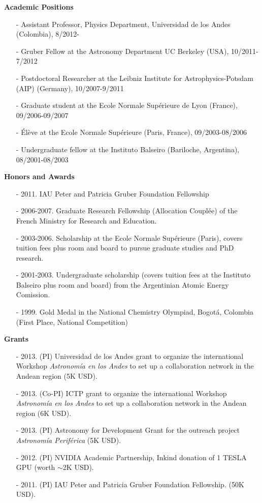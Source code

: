 \documentclass[letterpaper,11pt,onecolumn]{article}
\begin{document}
{\bf Academic Positions}
\begin{itemize}
\item[-] Assistant Professor, Physics Department, Universidad de los Andes (Colombia), 8/2012-
\item[-] Gruber Fellow at the Astronomy Department UC Berkeley (USA), 10/2011-7/2012
\item[-] Postdoctoral Researcher at the Leibniz Institute for
  Astrophysics-Potsdam (AIP) (Germany), 10/2007-9/2011  
\item[-] Graduate student at the Ecole Normale Sup\'erieure de Lyon
  (France), 09/2006-09/2007  
\item[-] \'El\`eve at the Ecole Normale Sup\'erieure (Paris, France),
  09/2003-08/2006 
\item[-] Undergraduate fellow at the Instituto Balseiro (Bariloche,
  Argentina), 08/2001-08/2003 
\end{itemize}

\newpage
{\bf Honors and Awards}
\begin{itemize}
\item[-] 2011. IAU Peter and Patricia Gruber Foundation Fellowship
\item[-] 2006-2007. Graduate Research Fellowship (Allocation Coupl\'ee) of the French
  Ministry for Research and Education.
\item[-] 2003-2006. Scholarship at the Ecole Normale Sup\'erieure (Paris), covers tuition fees plus room and
  board to pursue graduate studies and PhD research.
\item[-] 2001-2003. Undergraduate scholarship (covers tuition fees at the
  Instituto Balseiro plus room and board) from the Argentinian Atomic Energy
  Comission.
\item[-] 1999. Gold Medal in the National Chemistry Olympiad, Bogot\'a,
  Colombia (First Place, National Competition)
\end{itemize}

{\bf Grants}
\begin{itemize}
\item[-] 2013. (PI) Universidad de los Andes grant to organize the
  international Workshop \emph{Astronom\'ia en los Andes} to set up a
  collaboration network in the Andean region (5K USD). 
\item[-] 2013. (Co-PI) ICTP grant to organize the international
  Workshop \emph{Astronom\'ia en los Andes} to set up a collaboration
  network in the Andean region (6K USD). 
\item[-] 2013. (PI) Astronomy for Development Grant for the outreach
  project \emph{Astronom\'ia Perif\'erica} (5K USD). 
\item[-] 2012. (PI) NVIDIA Academic Partnership, Inkind donation of 1
  TESLA GPU (worth $\sim$2K USD). 
\item[-] 2011. (PI) IAU Peter and Patricia Gruber Foundation
  Fellowship. (50K USD).
\end{itemize}
\end{document}
